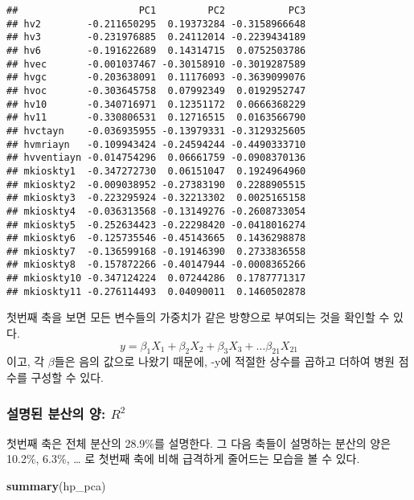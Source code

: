 \documentclass[
]{article}
\newenvironment{Shaded}{\begin{snugshade}}{\end{snugshade}}
\newcommand{\KeywordTok}[1]{\textcolor[rgb]{0.13,0.29,0.53}{\textbf{#1}}}
\newcommand{\NormalTok}[1]{#1}
\begin{document}
\begin{verbatim}
##                     PC1         PC2           PC3
## hv2        -0.211650295  0.19373284 -0.3158966648
## hv3        -0.231976885  0.24112014 -0.2239434189
## hv6        -0.191622689  0.14314715  0.0752503786
## hvec       -0.001037467 -0.30158910 -0.3019287589
## hvgc       -0.203638091  0.11176093 -0.3639099076
## hvoc       -0.303645758  0.07992349  0.0192952747
## hv10       -0.340716971  0.12351172  0.0666368229
## hv11       -0.330806531  0.12716515  0.0163566790
## hvctayn    -0.036935955 -0.13979331 -0.3129325605
## hvmriayn   -0.109943424 -0.24594244 -0.4490333710
## hvventiayn -0.014754296  0.06661759 -0.0908370136
## mkioskty1  -0.347272730  0.06151047  0.1924964960
## mkioskty2  -0.009038952 -0.27383190  0.2288905515
## mkioskty3  -0.223295924 -0.32213302  0.0025165158
## mkioskty4  -0.036313568 -0.13149276 -0.2608733054
## mkioskty5  -0.252634423 -0.22298420 -0.0418016274
## mkioskty6  -0.125735546 -0.45143665  0.1436298878
## mkioskty7  -0.136599168 -0.19146390  0.2733836558
## mkioskty8  -0.157872266 -0.40147944 -0.0008365266
## mkioskty10 -0.347124224  0.07244286  0.1787771317
## mkioskty11 -0.276114493  0.04090011  0.1460502878
\end{verbatim}

첫번째 축을 보면 모든 변수들의 가중치가 같은 방향으로 부여되는 것을
확인할 수 있다.
\[y=\beta_1X_1+\beta_2X_2+\beta_3X_3+ ... \beta_{21}X_{21}\]이고, 각
\(\beta\)들은 음의 값으로 나왔기 때문에, -y에 적절한 상수를 곱하고
더하여 병원 점수를 구성할 수 있다.

\hypertarget{uxc124uxba85uxb41c-uxbd84uxc0b0uxc758-uxc591-r2}{%
\subsubsection{\texorpdfstring{설명된 분산의 양:
\(R^2\)}{설명된 분산의 양: R\^{}2}}\label{uxc124uxba85uxb41c-uxbd84uxc0b0uxc758-uxc591-r2}}

첫번째 축은 전체 분산의 28.9\%를 설명한다. 그 다음 축들이 설명하는
분산의 양은 10.2\%, 6.3\%, \ldots{} 로 첫번째 축에 비해 급격하게
줄어드는 모습을 볼 수 있다.

\begin{Shaded}
\begin{Highlighting}[]
\KeywordTok{summary}\NormalTok{(hp_pca)}
\end{Highlighting}
\end{Shaded}
\end{document}
